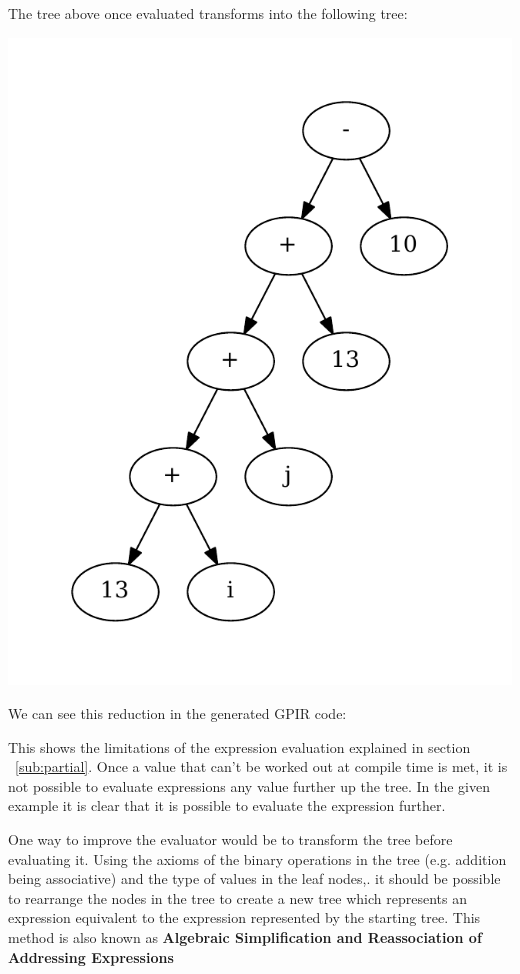 The tree above once evaluated transforms into the following tree: 

\begin{center}
\includegraphics[scale=0.5]{graphs/futureTree.pdf}
\end{center}

We can see this reduction in the generated GPIR code:



This shows the limitations of the expression evaluation explained in section ~\ref{sub:partial}.
Once a value that can't be worked out at compile time is met, it is not possible
to evaluate expressions any value further up the tree. In the given example
it is clear that it is possible to evaluate the expression further.

One way to improve the evaluator would be to transform the tree before evaluating it.
Using the axioms of the binary operations in the tree (e.g. addition being associative)
and the type of values in the leaf nodes,. it should be possible to rearrange the nodes in the 
tree to create a new tree which represents an expression equivalent to the expression
represented by the starting tree. This method is also known as \textbf{Algebraic Simplification and Reassociation
of Addressing Expressions}\cite[Section~12.3]{optimize}

